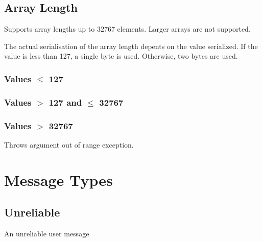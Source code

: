 \begin{messagedef}
\end{messagedef}


\subsection{Array Length}

Supports array lengths up to 32767 elements. Larger arrays are not supported.

The actual serialisation of the array length depents on the value serialized.
If the value is less than 127, a single byte is used. Otherwise, two bytes are used.

\subsubsection{Values $\le$ 127}

\begin{messagedef}
\end{messagedef}

\subsubsection{Values $>$ 127 and $\le$ 32767}

\begin{messagedef}
\end{messagedef}

\subsubsection{Values $>$ 32767}

Throws argument out of range exception.

\section{Message Types}

\subsection{Unreliable}
An unreliable user message

